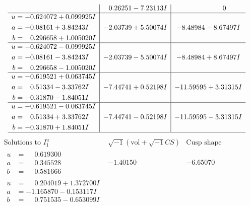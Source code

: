 \documentclass[1p]{elsarticle_modified}
\theoremstyle{definition}
\newcommand{\I}{\sqrt{-1}}
\begin{document}
$$\begin{array}{c|c|c}
 & \phantom{-}0.26251 - 7.23113 I & \phantom{-0.000000 } 0 \\ \hline\begin{aligned}
u &= -0.624072 + 0.099925 I \\
a &= -0.08161 + 3.84243 I \\
b &= \phantom{-}0.296658 + 1.005020 I\end{aligned}
 & -2.03739 + 5.50074 I & -8.48984 - 8.67497 I \\ \hline\begin{aligned}
u &= -0.624072 - 0.099925 I \\
a &= -0.08161 - 3.84243 I \\
b &= \phantom{-}0.296658 - 1.005020 I\end{aligned}
 & -2.03739 - 5.50074 I & -8.48984 + 8.67497 I \\ \hline\begin{aligned}
u &= -0.619521 + 0.063745 I \\
a &= \phantom{-}0.51334 - 3.33762 I \\
b &= -0.31870 - 1.84051 I\end{aligned}
 & -7.44741 + 0.52198 I & -11.59595 + 3.31315 I \\ \hline\begin{aligned}
u &= -0.619521 - 0.063745 I \\
a &= \phantom{-}0.51334 + 3.33762 I \\
b &= -0.31870 + 1.84051 I\end{aligned}
 & -7.44741 - 0.52198 I & -11.59595 - 3.31315 I\\
 \hline 
 \end{array}$$\newpage$$\begin{array}{c|c|c}  
\text{Solutions to }I^u_{1}& \I (\text{vol} + \sqrt{-1}CS) & \text{Cusp shape}\\
 \hline 
\begin{aligned}
u &= \phantom{-}0.619300\phantom{ +0.000000I} \\
a &= \phantom{-}0.345528\phantom{ +0.000000I} \\
b &= \phantom{-}0.581666\phantom{ +0.000000I}\end{aligned}
 & -1.40150\phantom{ +0.000000I} & -6.65070\phantom{ +0.000000I} \\ \hline\begin{aligned}
u &= \phantom{-}0.204019 + 1.372700 I \\
a &= -1.165870 - 0.153117 I \\
b &= \phantom{-}0.751535 - 0.653099 I\end{aligned}

\end{array}$$
\end{document}
